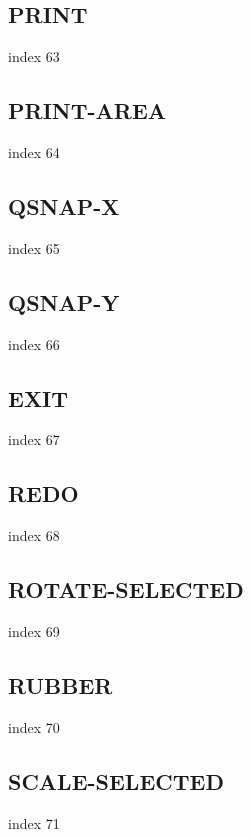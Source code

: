 \documentclass[11pt]{report}
\begin{document}
\subsection{PRINT}

index 63

\subsection{PRINT-AREA}

index 64

\subsection{QSNAP-X}

index 65

\subsection{QSNAP-Y}

index 66

\subsection{EXIT}

 index 67

\subsection{REDO}

index 68

\subsection{ROTATE-SELECTED}

index 69

\subsection{RUBBER}

index 70

\subsection{SCALE-SELECTED}

index 71
\end{document}
